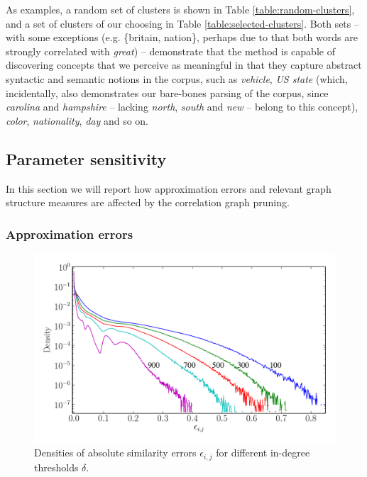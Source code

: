 \documentclass{kais}
\begin{document}
As examples, a random set of clusters is shown in Table \ref{table:random-clusters}, and a set of clusters of our choosing in 
Table \ref{table:selected-clusters}. Both sets -- with some exceptions (e.g. \{britain, nation\}, perhaps due to that both
words are strongly correlated with \emph{great}) -- demonstrate that the method is capable of discovering 
concepts that we perceive as meaningful in that they capture abstract syntactic and semantic notions in the corpus, such as
\emph{vehicle}, \emph{US state} (which, incidentally, also demonstrates our bare-bones parsing of the corpus,
since \emph{carolina} and \emph{hampshire} -- lacking \emph{north}, \emph{south} and \emph{new} -- belong to this concept),
\emph{color}, \emph{nationality}, \emph{day} and so on.

\subsection{Parameter sensitivity}

In this section we will report how approximation errors and relevant graph structure measures are affected by the 
correlation graph pruning.

\subsubsection{Approximation errors}
\label{subsubsec: approximation-errors}

\begin{figure}
\centerline{\includegraphics[width=0.75\columnwidth]{figures/1446451652-absolute_error_2.pdf}}
\caption{Densities of absolute similarity errors $\epsilon_{i,j}$ for different in-degree thresholds $\delta$.}
\label{fig:abs-error}
\end{figure}
\end{document}
